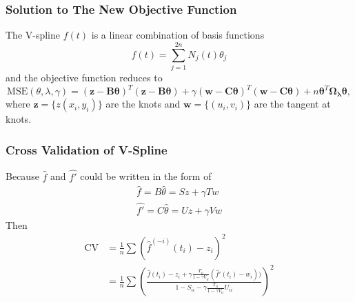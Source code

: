 \documentclass{beamer}
\begin{document}

\begin{frame}
\frametitle{Solution to The New Objective Function}
The V-spline $f(t)$ is a linear combination of basis functions
\begin{equation*}
f(t)=\sum_{j=1}^{2n} N_j(t)\theta_j 
\end{equation*}
and the objective function reduces to
\begin{equation*}
\mbox{MSE}(\theta,\lambda,\gamma)=(\mathbf{z}-\mathbf{B}\mathbf{\theta})^T(\mathbf{z}-\mathbf{B}\mathbf{\theta})+\gamma(\mathbf{w}-\mathbf{C}\mathbf{\theta})^T(\mathbf{w}-\mathbf{C}\mathbf{\theta})+n\mathbf{\theta}^T\mathbf{\Omega_\lambda}\mathbf{\theta},
\end{equation*}
where $\mathbf{z}=\{z(x_i,y_i)\}$ are the knots and $\mathbf{w}=\{(u_i,v_i)\}$ are the tangent at knots.
\end{frame}



\begin{frame}
\frametitle{Cross Validation of V-Spline}

Because $\hat{f}$ and $\hat{f'}$ could be written in the form of
\begin{align*}
\hat{f}=B\hat{\theta}=Sz+\gamma Tw\\
\hat{f'}=C\hat{\theta}=Uz+\gamma Vw
\end{align*}
Then
\begin{align*}
\mbox{CV}&=\frac{1}{n}\sum (\hat{f}^{(-i)}(t_i)-z_i)^2\\
&=\frac{1}{n}\sum \left(\frac{\hat{f}(t_i)-z_i+\gamma \frac{T_{ii}}{1-\gamma V_{ii}}(\hat{f}'(t_i)-w_i)) }{1-S_{ii}-\gamma \frac{T_{ii}}{1-\gamma V_{ii}}U_{ii}}\right)^2
\end{align*}
\end{frame}

\end{document}
